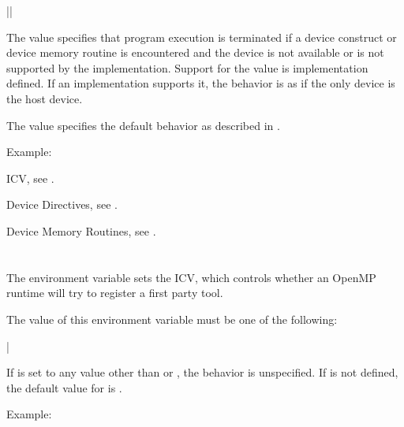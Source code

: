 {||}

The  value specifies that program execution is terminated if 
a device construct or device memory routine is encountered and the device is 
not available or is not supported by the implementation. Support for the 
 value is implementation defined.  If an implementation supports 
it, the behavior is as if the only device is the host device.

The  value specifies the default behavior as described in 
.

Example:
\begin{ompEnv}
\end{ompEnv}

\begin{crossrefs}
\item {} ICV, see .

\item Device Directives, see .

\item Device Memory Routines, see .
\end{crossrefs}



\section{}
\label{sec:OMP_TOOL}

The  environment variable sets the  ICV, which 
controls whether an OpenMP runtime will try to register a first party tool.

The value of this environment variable must be one of the following:

{|}

If  is set to any value other than  or 
, the behavior is unspecified. If  is not 
defined, the default value for  is .

Example:
\begin{ompEnv}
\end{ompEnv}

